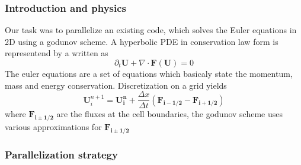 \documentclass{beamer}
\begin{document}
%
%
%
\begin{frame}
\frametitle{Introduction and physics}
\justify
Our task was to parallelize an existing code, which solves the Euler equations in 2D using a godunov scheme. A hyperbolic PDE in conservation law form is representend by a written as
\begin{equation}
\partial_t\mathbf{U} + \nabla\cdot\mathbf{F(U)} = 0
\label{eq:bb}
\end{equation}
The euler equations are a set of equations which basicaly state the momentum, mass and energy conservation. Discretization on a grid yields
\begin{equation}
\mathbf{U}^{n+1}_i=\mathbf{U^n_i}+\frac{\Delta x}{\Delta t}(\mathbf{F_{i-1/2}}-\mathbf{F_{i+1/2}})
\label{eq:bc}
\end{equation}
where $\mathbf{F_{i\pm1/2}}$ are the fluxes at the cell boundaries, the godunov scheme uses various approximations for $\mathbf{F_{i\pm1/2}}$
\vspace{1mm}

\end{frame}
%
%
%
\begin{frame}
\frametitle{Parallelization strategy}

\end{frame}
\end{document}

